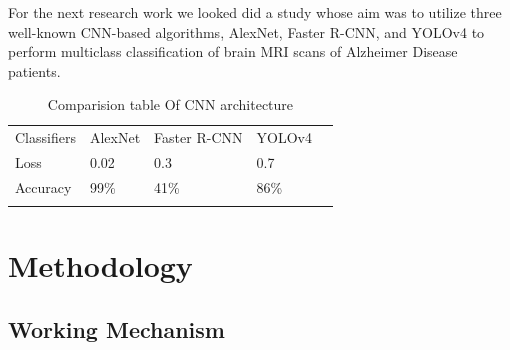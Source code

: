 \par
For the next research work we looked did a study whose aim was to utilize three well-known CNN-based algorithms, AlexNet, Faster R-CNN, and YOLOv4 to perform multiclass classification of brain MRI scans of Alzheimer Disease patients.
 
  \begin{center}
	\begin{table}[H]
	\centering
	\begin{tabular}{lllll}
	\cline{1-4}
	\multicolumn{1}{|l|}{Classifiers} & \multicolumn{1}{l|}{AlexNet} & \multicolumn{1}{l|}{Faster R-CNN} & \multicolumn{1}{l|}{YOLOv4} &  \\ \cline{1-4}
\multicolumn{1}{|l|}{Loss}        & \multicolumn{1}{l|}{0.02}    & \multicolumn{1}{l|}{0.3}          & \multicolumn{1}{l|}{0.7}    &  \\ \cline{1-4}
\multicolumn{1}{|l|}{Accuracy}    & \multicolumn{1}{l|}{99\%}    & \multicolumn{1}{l|}{41\%}         & \multicolumn{1}{l|}{86\%}   &  \\ \cline{1-4}
                                  &                              &                                   &                             & 
\cite{Mirchandani}
\end{tabular}
\caption{Comparision table Of CNN architecture}
\label{Comparision table Of CNN architecture}
\end{table}
\end{center}
\chapter{Methodology}
\vspace{-18pt}
  \section{Working Mechanism}
  \vspace{-18pt}
